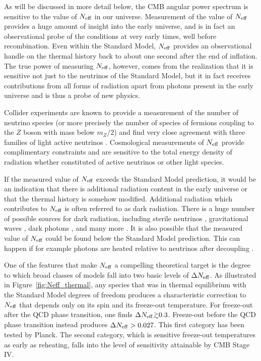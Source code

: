 As will be discussed in more detail below, the CMB angular power spectrum is sensitive to the value of $N_{\rm eff}$ in our universe.  Measurement of the value of $N_{\rm eff}$ provides a huge amount of insight into the early universe, and is in fact an observational probe of the conditions at very early times, well before recombination.  Even within the Standard Model, $N_{\rm eff}$ provides an observational handle on the thermal history back to about one second after the end of inflation.  The true power of measuring $N_{\rm eff}$, however, comes from the realization that it is sensitive not just to the neutrinos of the Standard Model, but it in fact receives contributions from all forms of radiation apart from photons present in the early universe and is thus a probe of new physics.

Collider experiments are known to provide a measurement of the number of neutrino species (or more precisely the number of species of fermions coupling to the $Z$ boson with mass below $m_Z/2$) and find very close agreement with three families of light active neutrinos \cite{ALEPH:2005ab}.  Cosmological measurements of $N_{\rm eff}$ provide complimentary constraints and are sensitive to the total energy density of radiation whether constituted of active neutrinos or other light species.

If the measured value of $N_{\rm eff}$ exceeds the Standard Model prediction, it would be an indication that there is additional radiation content in the early universe or that the thermal history is somehow modified.  Additional radiation which contributes to $N_{\rm eff}$ is often referred to as dark radiation.  There is a huge number of possible sources for dark radiation, including sterile neutrinos \cite{Abazajian:2001nj,Strumia:2006db,Boyarsky:2009ix}, gravitational waves \cite{Boyle:2007zx,Stewart:2007fu,Meerburg:2015zua}, dark photons \cite{Ackerman:mha,Kaplan:2011yj,CyrRacine:2012fz}, and many more \cite{Cadamuro:2010cz,Weinberg:2013kea}.  It is also possible that the measured value of $N_{\rm eff}$ could be found below the Standard Model prediction.  This can happen if for example photons are heated relative to neutrinos after decoupling \cite{Steigman:2013yua,Boehm:2013jpa}.

One of the features that make $N_{\rm eff}$ a compelling theoretical target is the degree to which broad classes of models fall into two basic levels of $\Delta N_{\rm eff}$.  As illustrated in Figure~\ref{fig:Neff_thermal}, any species that was in thermal equilibrium with the Standard Model degrees of freedom produces a characteristic correction to $N_{\rm eff}$ that depends only on its spin and its freeze-out temperature.  For freeze-out after the QCD phase transition, one finds $\Delta \Neff \gtrsim 0.3$.  Freeze-out before the QCD phase transition instead produces $\Delta N_{\rm eff} > 0.027$.  This first category has been tested by Planck.  The second category, which is sensitive freeze-out temperatures as early as reheating, falls into the level of sensitivity attainable by CMB Stage IV.

